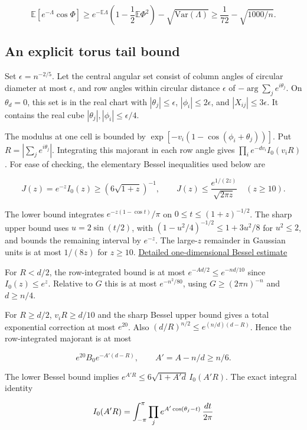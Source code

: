 \documentclass[11pt]{article}
\begin{document}
\[
\mathbb E[e^{-\Lambda}\cos\Phi]
\ge e^{-\mathbb E\Lambda}\left(1-\frac12\mathbb E\Phi^2\right)
 -\sqrt{\mathrm{Var}(\Lambda)}
\ge\frac1{72}-\sqrt{1000/n}.
\]

\subsection{An explicit torus tail bound}

Set $\epsilon=n^{-2/5}$. Let the central angular set consist of column angles of circular diameter at most $\epsilon$, and row angles within circular distance $\epsilon$ of $-\arg\sum_j e^{i\theta_j}$. On $\theta_d=0$, this set is in the real chart with $|\theta_j|\le\epsilon$, $|\phi_i|\le2\epsilon$, and $|X_{ij}|\le3\epsilon$. It contains the real cube $|\theta_j|,|\phi_i|\le\epsilon/4$.

The modulus at one cell is bounded by $\exp[-v_i(1-\cos(\phi_i+\theta_j))]$. Put $R=|\sum_j e^{i\theta_j}|$. Integrating this majorant in each row angle gives $\prod_i e^{-dv_i} I_0(v_iR)$. For ease of checking, the elementary Bessel inequalities used below are

\[
J(z)=e^{-z}I_0(z)\ge (6\sqrt{1+z})^{-1},\qquad
J(z)\le \frac{e^{1/(2z)}}{\sqrt{2\pi z}}\quad(z\ge10).
\]

The lower bound integrates $e^{-z(1-\cos t)}/\pi$ on $0\le t\le(1+z)^{-1/2}$. The sharp upper bound uses $u=2\sin(t/2)$, with $(1-u^2/4)^{-1/2}\le 1+3u^2/8$ for $u^2\le2$, and bounds the remaining interval by $e^{-z}$. The large-$z$ remainder in Gaussian units is at most $1/(8z)$ for $z\ge10$. \href{https://github.com/ProgramComputer/open-math-research/blob/7b585bad34491cf9e733a316e1b62f6c3529880f/topics/balanced-arrays/bessel-margins/upper.md}{Detailed one-dimensional Bessel estimate}

For $R<d/2$, the row-integrated bound is at most $e^{-Ad/2}\le e^{-nd/10}$ since $I_0(z)\le e^z$. Relative to $G$ this is at most $e^{-n^2/80}$, using $G\ge(2\pi n)^{-n}$ and $d\ge n/4$.

For $R\ge d/2$, $v_iR\ge d/10$ and the sharp Bessel upper bound gives a total exponential correction at most $e^{20}$. Also $(d/R)^{n/2}\le e^{(n/d)(d-R)}$. Hence the row-integrated majorant is at most

\[
e^{20}B_0 e^{-A'(d-R)},\qquad A'=A-n/d\ge n/6 .
\]

The lower Bessel bound implies $e^{A'R}\le6\sqrt{1+A'd}\,I_0(A'R)$. The exact integral identity

\[
I_0(A'R)=\int_{-\pi}^{\pi}\prod_j e^{A'\cos(\theta_j-t)}\thinspace{}\frac{dt}{2\pi}
\]
\end{document}
